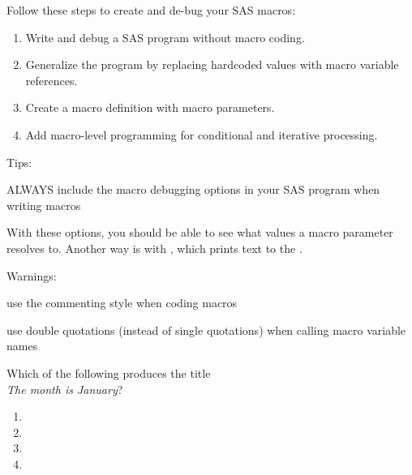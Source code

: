 \begin{frame}
Follow these steps to create and de-bug your SAS macros:
\begin{enumerate}
    \item Write and debug a SAS program without macro coding.
    \item Generalize the program by replacing hardcoded values with macro variable references.
    \item Create a macro definition with macro parameters.
    \item  Add macro-level programming for conditional and iterative processing.
\end{enumerate}
\end{frame}

\begin{frame}
Tips:
\bi
\item ALWAYS include the macro debugging options in your SAS program when writing macros
\item[] 
\item With these options, you should be able to see what values a macro parameter resolves to.  Another way is with , which prints text to the .
\item[] 
\item[]
\ei

Warnings:
\bi
    \item use the  commenting style when coding macros
    \item use double quotations (instead of single quotations) when calling macro variable names
\ei
\end{frame}

\begin{frame}
\begin{center}
\end{center}
\begin{clicker}{Which of the following produces the title \\ \emph{The month is January}?}
    \begin{enumerate}
        \item {}
        \item {}
        \item {}
        \item  {}
    \end{enumerate}
\end{clicker}
\end{frame}

